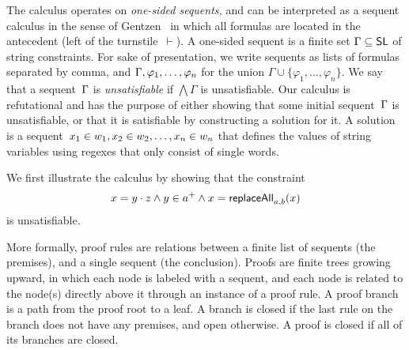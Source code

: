 The calculus operates on \emph{one-sided sequents,} and can be
interpreted as a sequent calculus in the sense of
Gentzen~\cite{Gentzen35} in which all formulas are located in the
antecedent (left of the turnstile~$\vdash$). A one-sided sequent is a
finite set $\Gamma \subseteq \mathsf{SL}$ of string constraints. For sake
of presentation, we write sequents as lists of formulas separated by
comma, and $\seqq{\varphi_1, \ldots, \varphi_n}$ for the union
$\Gamma \cup \{\varphi_1, \ldots, \varphi_n\}$. We say that a
sequent~$\seqq{}$ is \emph{unsatisfiable} if $\bigwedge \Gamma$ is
unsatisfiable. Our calculus is refutational and has the purpose of
either showing that some initial sequent~$\seqq{}$ is unsatisfiable,
or that it is satisfiable by constructing a solution for it. A
solution is a
sequent~$x_1 \in w_1, x_2 \in w_2, \ldots, x_n \in w_n$ that
defines the values of string variables using regexes that only consist
of single words.

\begin{example}
  We first illustrate the calculus by showing that the constraint
  $$x = y \cdot z \wedge y \in a^+ \wedge x = \mathsf{replaceAll}_{a,
    b}(x)$$
  is unsatisfiable.
\end{example}

More formally, proof rules are relations between a finite list of
sequents (the premises), and a single sequent (the conclusion). Proofs
are finite trees growing upward, in which each node is labeled with a
sequent, and each node is related to the node(s) directly above it
through an instance of a proof rule. A proof branch is a path from the
proof root to a leaf. A branch is closed if the last rule on the
branch does not have any premises, and open otherwise. A proof is
closed if all of its branches are closed.

